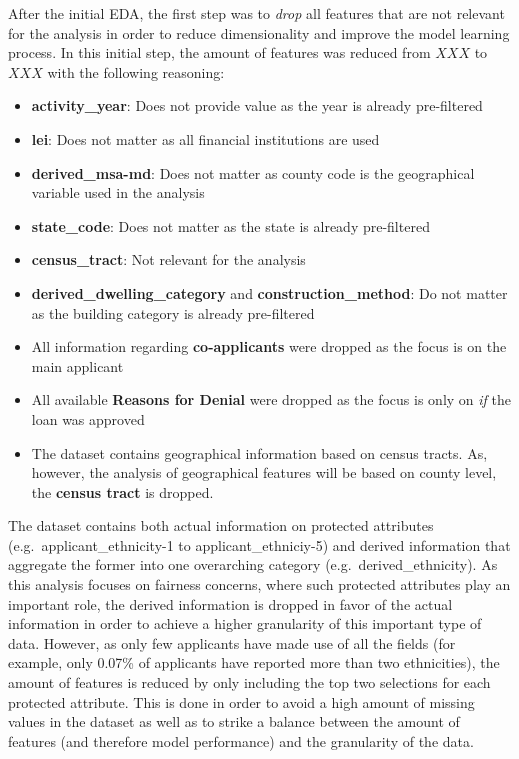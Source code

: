After the initial EDA, the first step was to \textit{drop} all features that are not relevant for the analysis in order to reduce dimensionality and improve the model learning process. \@ 
In this initial step, the amount of features was reduced from $XXX$ to $XXX$ with the following reasoning:
\begin{itemize}
    \item \textbf{activity\_year}: Does not provide value as the year is already pre-filtered
    \item \textbf{lei}: Does not matter as all financial institutions are used
    \item \textbf{derived\_msa-md}: Does not matter as county code is the geographical variable used in the analysis
    \item \textbf{state\_code}: Does not matter as the state is already pre-filtered
    \item \textbf{census\_tract}: Not relevant for the analysis
    \item \textbf{derived\_dwelling\_category} and \textbf{construction\_method}: Do not matter as the building category is already pre-filtered
    \item All information regarding \textbf{co-applicants} were dropped as the focus is on the main applicant
    \item All available \textbf{Reasons for Denial} were dropped as the focus is only on \textit{if} the loan was approved
    \item The dataset contains geographical information based on census tracts. As, however, the analysis of geographical features will be based on county level, the \textbf{census tract} is dropped.
\end{itemize}

The dataset contains both actual information on protected attributes (e.g.\ \mbox{applicant\_ethnicity-1} to \mbox{applicant\_ethniciy-5}) and derived information that aggregate the former into one overarching category (e.g.\ \mbox{derived\_ethnicity}). 
As this analysis focuses on fairness concerns, where such protected attributes play an important role, the derived information is dropped in favor of the actual information in order to achieve a higher granularity of this important type of data.  
However, as only few applicants have made use of all the fields (for example, only 0.07\% of applicants have reported more than two ethnicities), the amount of features is reduced by only including the top two selections for each protected attribute. 
This is done in order to avoid a high amount of missing values in the dataset as well as to strike a balance between the amount of features (and therefore model performance) and the granularity of the data.

